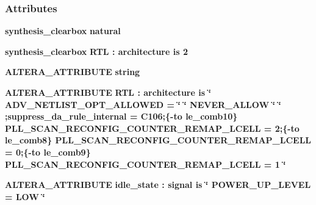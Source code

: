 \subsubsection*{Attributes}
 \begin{DoxyCompactItemize}
\item 
{\bf synthesis\+\_\+clearbox} {\bfseries \textcolor{comment}{natural}\textcolor{vhdlchar}{ }} 
\item 
{\bf synthesis\+\_\+clearbox} {\bfseries \textcolor{vhdlchar}{R\+TL}\textcolor{vhdlchar}{ }\textcolor{vhdlchar}{\+:}\textcolor{vhdlchar}{ }\textcolor{keywordflow}{architecture}\textcolor{vhdlchar}{ }\textcolor{keywordflow}{is}\textcolor{vhdlchar}{ }\textcolor{vhdlchar}{ } \textcolor{vhdldigit}{2} \textcolor{vhdlchar}{ }} 
\item 
{\bf A\+L\+T\+E\+R\+A\+\_\+\+A\+T\+T\+R\+I\+B\+U\+TE} {\bfseries \textcolor{comment}{string}\textcolor{vhdlchar}{ }} 
\item 
{\bf A\+L\+T\+E\+R\+A\+\_\+\+A\+T\+T\+R\+I\+B\+U\+TE} {\bfseries \textcolor{vhdlchar}{R\+TL}\textcolor{vhdlchar}{ }\textcolor{vhdlchar}{\+:}\textcolor{vhdlchar}{ }\textcolor{keywordflow}{architecture}\textcolor{vhdlchar}{ }\textcolor{keywordflow}{is}\textcolor{vhdlchar}{ }\textcolor{vhdlchar}{ }\textcolor{vhdlchar}{ }\textcolor{vhdlchar}{ }\textcolor{keyword}{\char`\"{} A\+D\+V\+\_\+\+N\+E\+T\+L\+I\+S\+T\+\_\+\+O\+P\+T\+\_\+\+A\+L\+L\+O\+W\+E\+D = \char`\"{}}\textcolor{vhdlchar}{ }\textcolor{keyword}{\char`\"{} N\+E\+V\+E\+R\+\_\+\+A\+L\+L\+O\+W \char`\"{}}\textcolor{vhdlchar}{ }\textcolor{keyword}{\char`\"{} ;suppress\+\_\+da\+\_\+rule\+\_\+internal = C106;\{-\/to le\+\_\+comb10\} P\+L\+L\+\_\+\+S\+C\+A\+N\+\_\+\+R\+E\+C\+O\+N\+F\+I\+G\+\_\+\+C\+O\+U\+N\+T\+E\+R\+\_\+\+R\+E\+M\+A\+P\+\_\+\+L\+C\+E\+L\+L = 2;\{-\/to le\+\_\+comb8\} P\+L\+L\+\_\+\+S\+C\+A\+N\+\_\+\+R\+E\+C\+O\+N\+F\+I\+G\+\_\+\+C\+O\+U\+N\+T\+E\+R\+\_\+\+R\+E\+M\+A\+P\+\_\+\+L\+C\+E\+L\+L = 0;\{-\/to le\+\_\+comb9\} P\+L\+L\+\_\+\+S\+C\+A\+N\+\_\+\+R\+E\+C\+O\+N\+F\+I\+G\+\_\+\+C\+O\+U\+N\+T\+E\+R\+\_\+\+R\+E\+M\+A\+P\+\_\+\+L\+C\+E\+L\+L = 1 \char`\"{}}\textcolor{vhdlchar}{ }} 
\item 
{\bf A\+L\+T\+E\+R\+A\+\_\+\+A\+T\+T\+R\+I\+B\+U\+TE} {\bfseries {\bfseries {\bf idle\+\_\+state}} \textcolor{vhdlchar}{ }\textcolor{vhdlchar}{\+:}\textcolor{vhdlchar}{ }\textcolor{keywordflow}{signal}\textcolor{vhdlchar}{ }\textcolor{keywordflow}{is}\textcolor{vhdlchar}{ }\textcolor{vhdlchar}{ }\textcolor{vhdlchar}{ }\textcolor{vhdlchar}{ }\textcolor{keyword}{\char`\"{} P\+O\+W\+E\+R\+\_\+\+U\+P\+\_\+\+L\+E\+V\+E\+L = L\+O\+W \char`\"{}}\textcolor{vhdlchar}{ }} 

\end{DoxyCompactItemize}
